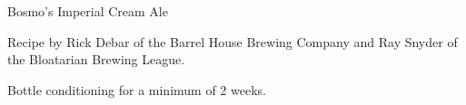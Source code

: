 \begin{recipe}{Bosmo's Imperial Cream Ale} %

\begin{aboutblock}
Recipe by Rick Debar of the Barrel House Brewing Company and Ray Snyder of the
Bloatarian Brewing League.
\end{aboutblock}


\begin{methodandtiming}

\begin{mashsteps}
\end{mashsteps}

\begin{fermentationsteps}
\end{fermentationsteps}

\begin{directions}
Bottle conditioning for a minimum of 2 weeks.
\end{directions}

\end{methodandtiming}

\recipebreak

\begin{ingredientsblock}

\begin{malts}
\end{malts}

\begin{hops}
\end{hops}


\end{ingredientsblock}

\end{recipe}

